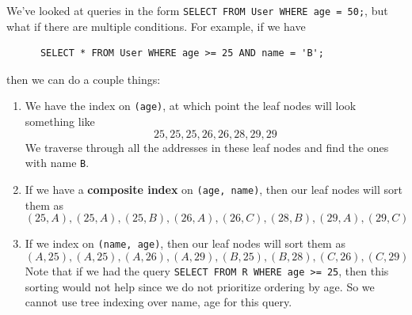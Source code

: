   \begin{definition}
    We've looked at queries in the form \texttt{SELECT \* FROM User WHERE age = 50;}, but what if there are multiple conditions. For example, if we have 
    \begin{lstlisting}
      SELECT * FROM User WHERE age >= 25 AND name = 'B'; 
    \end{lstlisting}
    then we can do a couple things: 
    \begin{enumerate}
      \item We have the index on \texttt{(age)}, at which point the leaf nodes will look something like 
        \begin{equation}
          25, 25, 25, 26, 26, 28, 29, 29
        \end{equation}
        We traverse through all the addresses in these leaf nodes and find the ones with name \texttt{B}. 

      \item If we have a \textbf{composite index} on \texttt{(age, name)}, then our leaf nodes will sort them as 
        \begin{equation}
          (25, A), (25, A), (25, B), (26, A), (26, C), (28, B), (29, A), (29, C)
        \end{equation}

      \item If we index on \texttt{(name, age)}, then our leaf nodes will sort them as 
        \begin{equation}
          (A, 25), (A, 25), (A, 26), (A, 29), (B, 25), (B, 28), (C, 26), (C, 29)
        \end{equation}
        Note that if we had the query \texttt{SELECT \* FROM R WHERE age >= 25}, then this sorting would not help since we do not prioritize ordering by age. So we cannot use tree indexing over name, age for this query. 
    \end{enumerate}
  \end{definition}

